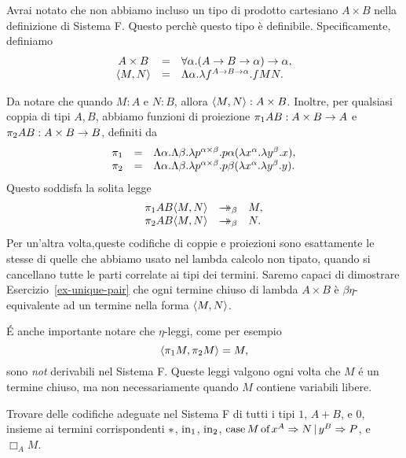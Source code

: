 \documentclass{article}
\begin{document}
Avrai notato che non abbiamo incluso un tipo di prodotto cartesiano
$A\times B$ nella definizione di Sistema F. Questo perch\`e questo tipo
\`e definibile. Specificamente, definiamo
\[ \begin{array}{ccl}
A\times B &=& \forall\alpha.(A\to B\to\alpha)\to\alpha,\\
\langle M,N\rangle &=& \Lambda\alpha.\lambda f^{A\to B\to\alpha}.fMN.
\end{array}
\]

Da notare che quando $M:A$ e $N:B$, allora $\langle M,N\rangle:A\times B$. Inoltre,
per qualsiasi coppia di tipi $A,B$, abbiamo funzioni di
proiezione $\pi_1 AB : A\times B\to A$ e $\pi_2 AB : A\times B\to
B$, definiti da
\[ \begin{array}{ccl}
\pi_1 &=& \Lambda\alpha.\Lambda\beta.\lambda p^{\alpha\times
	\beta}.p\alpha(\lambda x^{\alpha}.\lambda y^{\beta}.x),\\
\pi_2 &=& \Lambda\alpha.\Lambda\beta.\lambda p^{\alpha\times
	\beta}.p\beta(\lambda x^{\alpha}.\lambda y^{\beta}.y).
\end{array}
\]
Questo soddisfa la solita legge
\[ \begin{array}{ccl}
\leftt AB\pair{M,N} &\redbs& M,\\
\rightt AB\pair{M,N} &\redbs& N.
\end{array}
\]
Per un'altra volta,queste codifiche di coppie e proiezioni 
sono esattamente le stesse di quelle che abbiamo usato nel  lambda 
calcolo non tipato, quando si cancellano tutte le parti correlate ai tipi 
dei termini. Saremo capaci di dimostrare
Esercizio~\ref{ex-unique-pair} che ogni termine chiuso di lambda $A\times
B$ \`e $\beta\eta$-equivalente ad un termine nella forma $\langle M,N\rangle$.

\begin{remark}
	\'E anche importante notare che $\eta$-leggi, come per esempio
	\[  \langle\pi_1 M,\pi_2 M\rangle=M,
	\] sono {\em not} derivabili nel Sistema F. Queste leggi valgono ogni volta che $M$
	\'e un termine chiuso, ma non necessariamente quando $M$ contiene variabili
	libere.
\end{remark}

\begin{exercise}\label{ex-encodings}
	Trovare delle codifiche adeguate nel Sistema F di tutti i tipi $1$, $A+B$, e
	$0$, insieme ai termini corrispondenti ${*}$, $\mbox{\rm in}_1$, $\mbox{\rm in}_2$,
	$\mathop{\mbox{\rm case}}M\mathop{\mbox{\rm of}}x^A\Rightarrow N\mathop{|}y^B\Rightarrow P$, e $\Box_A{M}$.
\end{exercise}

\end{document}
